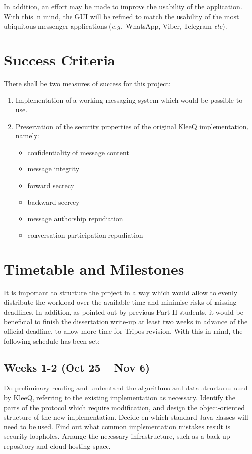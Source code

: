 \documentclass[a4paper, twoside, 12pt]{report}
\begin{document}
\begin{appendices}
\vspace{\baselineskip}
\noindent
In addition, an effort may be made to improve the usability of the application. With this in mind, the GUI will be refined to match the usability of the most ubiquitous messenger applications (\textit{e.g.}~WhatsApp, Viber, Telegram \textit{etc}).




\section{Success Criteria}
There shall be two measures of success for this project:
\begin{enumerate}
    \item Implementation of a working messaging system which would be possible to use.
    \item Preservation of the security properties of the original KleeQ implementation, namely:
        \begin{itemize}
            \item confidentiality of message content
            \item message integrity
            \item forward secrecy
            \item backward secrecy
            \item message authorship repudiation
            \item conversation participation repudiation
        \end{itemize}
\end{enumerate}




\section{Timetable and Milestones}
It is important to structure the project in a way which would allow to evenly distribute the workload over the available time and minimise risks of missing deadlines. In addition, as pointed out by previous Part II students, it would be beneficial to finish the dissertation write-up at least two weeks in advance of the official deadline, to allow more time for Tripos revision. With this in mind, the following schedule has been set:


\subsection*{Weeks 1-2 (Oct 25 -- Nov 6)}
Do preliminary reading and understand the algorithms and data structures used by KleeQ, referring to the existing implementation as necessary. Identify the parts of the protocol which require modification, and design the object-oriented structure of the new implementation. Decide on which standard Java classes will need to be used. Find out what common implementation mistakes result is security loopholes. Arrange the necessary infrastructure, such as a back-up repository and cloud hosting space.


\end{appendices}
\end{document}

